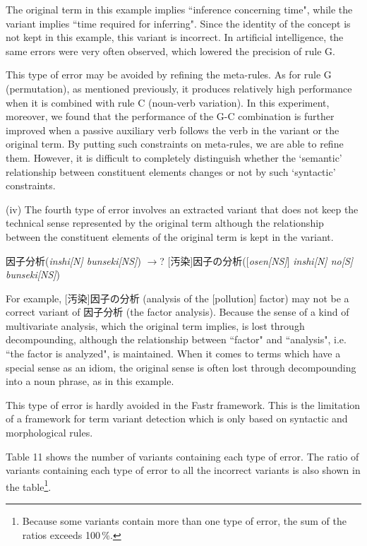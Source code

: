 \vspace{5mm}
\noindent
The original term in this example implies ``inference concerning time", while the variant implies ``time required for inferring". Since the identity of the concept is not kept in this example, this variant is incorrect. In artificial intelligence, the same errors were very often observed, which lowered the precision of rule G.

This type of error may be avoided by refining the meta-rules. As for rule G (permutation), as mentioned previously, it produces relatively high performance when it is combined with rule C (noun-verb variation). In this experiment, moreover, we found that the performance of the G-C combination is further improved when a passive auxiliary verb follows the verb in the variant or the original term. By putting such constraints on meta-rules, we are able to refine them. However, it is difficult to completely distinguish whether the `semantic' relationship between constituent elements changes or not by such `syntactic' constraints.

\vspace{5mm}
\noindent
(iv) The fourth type of error involves an extracted variant that does not keep the technical sense represented by the original term although the relationship between the constituent elements of the original term is kept in the variant.

\vspace{5mm}
\noindent
因子分析({\it inshi[N] bunseki[NS]}) $\rightarrow$? [汚染]因子の分析([{\it osen[NS]}] {\it inshi[N] no[S] bunseki[NS]})

\vspace{5mm}
\noindent
For example, [汚染]因子の分析 (analysis of the [pollution] factor) may not be a correct variant of 因子分析 (the factor analysis). Because the sense of a kind of multivariate analysis, which the original term implies, is lost through decompounding, although the relationship between ``factor" and ``analysis", i.e. ``the factor is analyzed", is maintained. When it comes to terms which have a special sense as an idiom, the original sense is often lost through decompounding into a noun phrase, as in this example.

This type of error is hardly avoided in the Fastr framework. This is the limitation of a framework for term variant detection which is only based on syntactic and morphological rules.

Table 11 shows the number of variants containing each type of error. The ratio of variants containing each type of error to all the incorrect variants is also shown in the table\footnote{Because some variants contain more than one type of error, the sum of the ratios exceeds 100\,\%.}.

